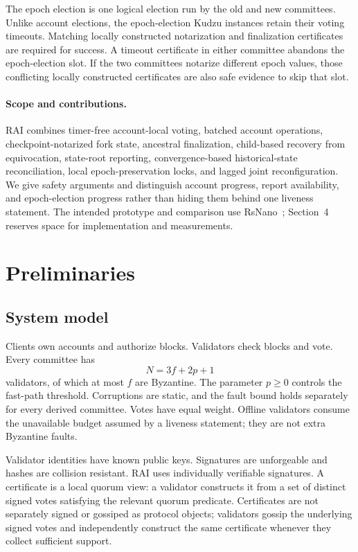 \documentclass[10pt,twocolumn]{article}
\begin{document}
The epoch election is one logical election run by the old and new committees. Unlike account elections, the epoch-election Kudzu instances retain their voting timeouts. Matching locally constructed notarization and finalization certificates are required for success. A timeout certificate in either committee abandons the epoch-election slot. If the two committees notarize different epoch values, those conflicting locally constructed certificates are also safe evidence to skip that slot.

\paragraph{Scope and contributions.} RAI combines timer-free account-local voting, batched account operations, checkpoint-notarized fork state, ancestral finalization, child-based recovery from equivocation, state-root reporting, convergence-based historical-state reconciliation, local epoch-preservation locks, and lagged joint reconfiguration. We give safety arguments and distinguish account progress, report availability, and epoch-election progress rather than hiding them behind one liveness statement. The intended prototype and comparison use RsNano~\cite{RsNano}; Section~4 reserves space for implementation and measurements.

\section{Preliminaries}
\subsection{System model}
Clients own accounts and authorize blocks. Validators check blocks and vote. Every committee has
\begin{equation}
N = 3f + 2p + 1
\end{equation}
validators, of which at most $f$ are Byzantine. The parameter $p\ge 0$ controls the fast-path threshold. Corruptions are static, and the fault bound holds separately for every derived committee. Votes have equal weight. Offline validators consume the unavailable budget assumed by a liveness statement; they are not extra Byzantine faults.

Validator identities have known public keys. Signatures are unforgeable and hashes are collision resistant. RAI uses individually verifiable signatures. A certificate is a local quorum view: a validator constructs it from a set of distinct signed votes satisfying the relevant quorum predicate. Certificates are not separately signed or gossiped as protocol objects; validators gossip the underlying signed votes and independently construct the same certificate whenever they collect sufficient support.
\end{document}
